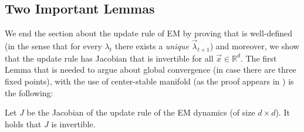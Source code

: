 \subsection{Two Important Lemmas}
We end the section about the update rule of EM by proving that is well-defined (in the sense that for every $\lambda_t$ there exists a \textit{unique} $\vec{\lambda}_{t+1}$) and moreover, we show that the update rule has Jacobian that is invertible for all $\vec{x} \in \mathbb{R}^d$.
The first Lemma that is needed to argue about global convergence (in case there are three fixed points), with the use of center-stable manifold (as the proof appears in \cite{LPPSJR17}) is the following:
\begin{lemma}\label{lem:localdiff} Let $J$ be the Jacobian of the update rule of the EM dynamics (of size $d \times d$). It holds that $J$ is invertible.
\end{lemma}
